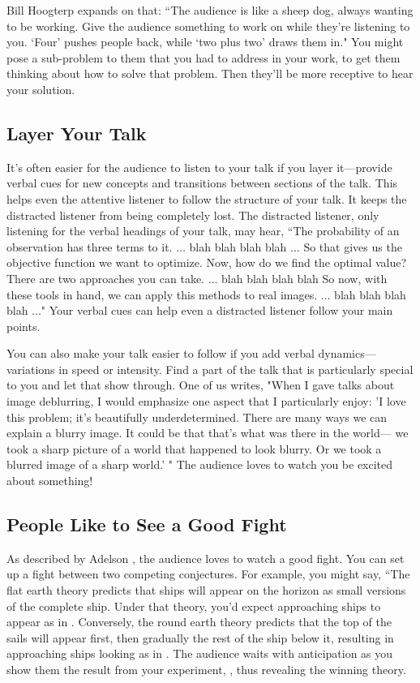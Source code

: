 Bill Hoogterp \cite{Hoogterp} expands on that:
``The audience is like a sheep dog, always wanting to be working.  Give the audience something to work on while they're listening to you. `Four' pushes people back, while `two plus two' draws them in."  You might pose a sub-problem to them that you had to address in your work, to get them thinking about how to solve that problem.  Then they'll be more receptive to hear your solution.

\subsection{Layer Your Talk}
It's often easier for the audience to listen to your talk if you layer it---provide verbal cues for new concepts and transitions between sections of the talk.  This helps even the attentive listener to follow the structure of your talk.  It keeps the distracted listener from being completely lost.  The distracted listener, only listening for the verbal headings of your talk, may hear,
``The probability of an observation has three terms to it.  $\ldots$ blah blah blah blah $\ldots$
So that gives us the objective function we want to optimize.  Now, how do we find the optimal value?  There are two approaches you can take.  $\ldots$ blah blah blah blah
So now, with these tools in hand, we can apply this methods to real images. $\ldots$ blah blah blah blah $\ldots$"
Your verbal cues can help even a distracted listener follow your main points.

You can also make your talk easier to follow if you add verbal dynamics---variations in speed or intensity.  Find a part of the talk that is particularly special to you and let that show through.  One of us writes, "When I gave talks about image deblurring, I would emphasize one aspect that I particularly enjoy:
'I love this problem;  it’s beautifully underdetermined.  There are many ways we can explain a blurry image.  It could be that that’s what was there in the world--- we took a sharp picture of a world that happened to look blurry.  Or we took a blurred image of a sharp world.' " The audience loves to watch you be excited about something!


\subsection{People Like to See a Good Fight}

As described by Adelson \cite{Adelson95}, the audience loves to watch a good fight.  You can set up a fight between two competing conjectures.  For example, you might say, ``The flat earth theory predicts that ships will appear on the horizon as small versions of the complete ship.  Under that theory, you’d expect approaching ships to appear as in .  Conversely, the round earth theory predicts that the top of the sails will appear first, then gradually the rest of the ship below it, resulting in approaching ships looking as in .  The audience waits with anticipation as you show them the result from your experiment, , thus revealing the winning theory.

